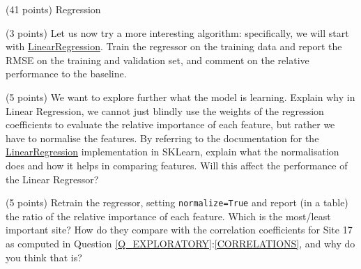 \documentclass[12pt]{article}
\begin{document}
\begin{question}{\label{Q_LR_BA}(41 points) Regression}
\begin{subquestion}
\end{subquestion}

\begin{subquestion}{(3 points) Let us now try a more interesting algorithm: specifically, we will start with \href{https://scikit-learn.org/stable/modules/generated/sklearn.linear_model.LinearRegression.html}{LinearRegression}. Train the regressor on the training data and report the RMSE on the training and validation set, and comment on the relative performance to the baseline.}






\end{subquestion}



\begin{subquestion}{(5 points) We want to explore further what the model is learning. Explain why in Linear Regression, we cannot just blindly use the weights of the regression coefficients to evaluate the relative importance of each feature, but rather we have to normalise the features. By referring to the documentation for the \href{http://scikit-learn.org/stable/modules/generated/sklearn.linear_model.LinearRegression.html}{LinearRegression} implementation in SKLearn, explain what the normalisation does and how it helps in comparing features. Will this affect the performance of the Linear Regressor?}






\end{subquestion}

\begin{subquestion}{(5 points) Retrain the regressor, setting \texttt{normalize=True} and report (in a table) the ratio of the relative importance of each feature. Which is the most/least important site? How do they compare with the correlation coefficients for Site 17 as computed in Question \ref{Q_EXPLORATORY}:\ref{CORRELATIONS}, and why do you think that is?}




\end{subquestion}
\end{question}
\end{document}
